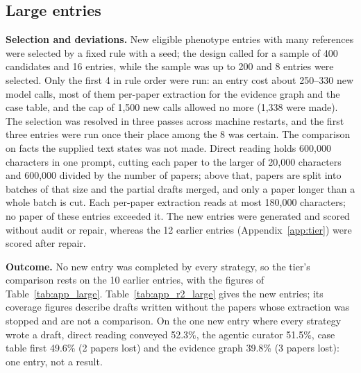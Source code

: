\documentclass{article} %
\begin{document}
\subsection{Large entries}
\label{app:large_new}
\textbf{Selection and deviations.} New eligible phenotype entries with many references were selected by a fixed rule with a seed; the design called for a sample of 400 candidates and 16 entries, while the sample was up to 200 and 8 entries were selected. Only the first 4 in rule order were run: an entry cost about 250--330 new model calls, most of them per-paper extraction for the evidence graph and the case table, and the cap of 1,500 new calls allowed no more (1,338 were made). The selection was resolved in three passes across machine restarts, and the first three entries were run once their place among the 8 was certain. The comparison on facts the supplied text states was not made. Direct reading holds 600,000 characters in one prompt, cutting each paper to the larger of 20,000 characters and 600,000 divided by the number of papers; above that, papers are split into batches of that size and the partial drafts merged, and only a paper longer than a whole batch is cut. Each per-paper extraction reads at most 180,000 characters; no paper of these entries exceeded it. The new entries were generated and scored without audit or repair, whereas the 12 earlier entries (Appendix~\ref{app:tier}) were scored after repair.

\textbf{Outcome.} No new entry was completed by every strategy, so the tier's comparison rests on the 10 earlier entries, with the figures of Table~\ref{tab:app_large}. Table~\ref{tab:app_r2_large} gives the new entries; its coverage figures describe drafts written without the papers whose extraction was stopped and are not a comparison. On the one new entry where every strategy wrote a draft, direct reading conveyed 52.3\%, the agentic curator 51.5\%, case table first 49.6\% (2 papers lost) and the evidence graph 39.8\% (3 papers lost): one entry, not a result.
\end{document}
